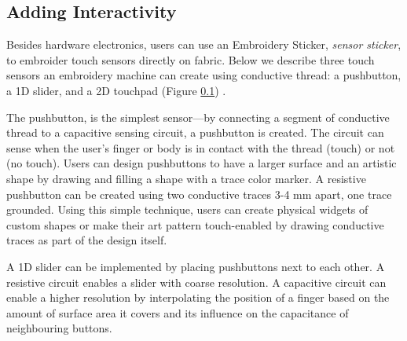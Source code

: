 \documentclass[header.tex]{subfiles}
\begin{document}






\subsection{Adding Interactivity}
Besides hardware electronics, users can use an Embroidery Sticker, \textit{sensor sticker}, to embroider touch sensors directly on fabric. Below we describe three touch sensors an embroidery machine can create using conductive thread: a pushbutton, a 1D slider, and a 2D touchpad (Figure \ref{}) .

The pushbutton, is the simplest sensor---by connecting a segment of conductive thread to a capacitive sensing circuit, a pushbutton is created. The circuit can sense when the user's finger or body is in contact with the thread (touch) or not (no touch). Users can design pushbuttons to have a larger surface and an artistic shape by drawing and filling a shape with a trace color marker. A resistive pushbutton can be created using two conductive traces 3-4 mm apart, one trace grounded. Using this simple technique, users can create physical widgets of custom shapes or make their art pattern touch-enabled by drawing conductive traces as part of the design itself.


A 1D slider can be implemented by placing pushbuttons next to each other. A resistive circuit enables a slider with coarse resolution. A capacitive circuit can enable a higher resolution by interpolating the position of a finger based on the amount of surface area it covers and its influence on the capacitance of neighbouring buttons.
\end{document}
